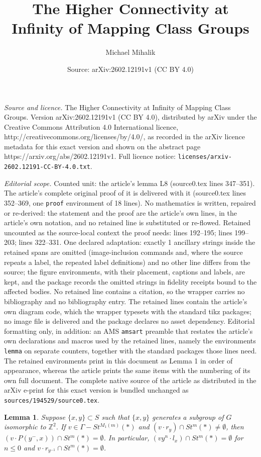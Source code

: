 \documentclass[10pt,a4paper]{amsart}
\title{The Higher Connectivity at Infinity of Mapping Class Groups}
\author{Michael Mihalik}
\date{Source: arXiv:2602.12191v1 (CC BY 4.0)}
\newtheorem{lemma}{Lemma}
\begin{document}
\maketitle

\noindent\emph{Source and licence.} The Higher Connectivity at Infinity of Mapping Class Groups. Version arXiv:2602.12191v1 (CC BY 4.0), distributed by arXiv under the Creative Commons Attribution 4.0 International licence, http://creativecommons.org/licenses/by/4.0/, as recorded in the arXiv licence metadata for this exact version and shown on the abstract page https://arxiv.org/abs/2602.12191v1. Full licence notice: \texttt{licenses/arxiv-2602.12191-CC-BY-4.0.txt}.\par\smallskip

\noindent\textit{Editorial scope.} Counted unit: the article's lemma L8 (source0.tex lines 347--351). The article's complete original proof of it is delivered with it (source0.tex lines 352--369, one \texttt{proof} environment of 18 lines). No mathematics is written, repaired or re-derived: the statement and the proof are the article's own lines, in the article's own notation, and no retained line is substituted or re-flowed.  Retained uncounted as the source-local context the proof needs: lines 192--195; lines 199--203; lines 322--331.  One declared adaptation: exactly 1 ancillary strings inside the retained spans are omitted (image-inclusion commands and, where the source repeats a label, the repeated label definitions) and no other line differs from the source; the figure environments, with their placement, captions and labels, are kept, and the package records the omitted strings in fidelity receipts bound to the affected bodies.  No retained line contains a citation, so the wrapper carries no bibliography and no bibliography entry.  The retained lines contain the article's own diagram code, which the wrapper typesets with the standard tikz packages; no image file is delivered and the package declares no asset dependency.  Editorial formatting only, in addition: an AMS \texttt{amsart} preamble that restates the article's own declarations and macros used by the retained lines, namely the environments \texttt{lemma} on separate counters, together with the standard packages those lines need.  The retained environments print in this document as Lemma 1 in order of appearance, whereas the article prints the same items with the numbering of its own full document.  The complete native source of the article as distributed in the arXiv e-print for this exact version is bundled unchanged as \texttt{sources/194529/source0.tex}.
\begin{lemma}\label{L2}
Suppose $\{x,y\}\subset S$ such that $\{x,y\}$ generates a subgroup of $G$ isomorphic to $\mathbb Z^2$. If  $v\in \Gamma-St^{M_1(m)}(\ast)$ and 
$(v\cdot r_y)\cap St^m(\ast)\ne\emptyset$, then  $(v\cdot P(y^-,x))\cap St^m(\ast)=\emptyset$. In particular, $(vy^n\cdot l_x)\cap St^m(\ast)=\emptyset$ for $n\leq 0$ and $v\cdot r_{y^{-1}}\cap St^m(\ast)=\emptyset$. 
\end{lemma}
\end{document}
